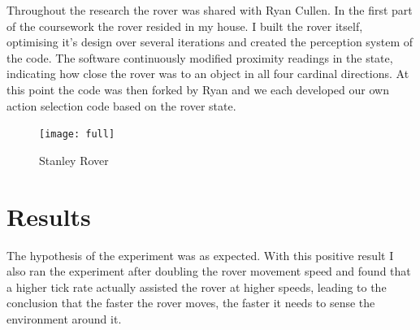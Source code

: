\documentclass[a4paper,12pt,twocolumn]{report}
\begin{document}
Throughout the research the rover was shared with Ryan Cullen. In the first part of the coursework the rover resided in my house. I built the rover itself, optimising it's design over several iterations and created the perception system of the code. The software continuously modified proximity readings in the state, indicating how close the rover was to an object in all four cardinal directions. At this point the code was then forked by Ryan and we each developed our own action selection code based on the rover state.

\begin{figure}[b]
 \texttt{[image: full]}
 \caption{Stanley Rover}
 \label{fig:stanley}
\end{figure}

\section{Results}



%

The hypothesis of the experiment was as expected. With this positive result I also ran the experiment after doubling the rover movement speed and found that a higher tick rate actually assisted the rover at higher speeds, leading to the conclusion that the faster the rover moves, the faster it needs to sense the environment around it.
\end{document}
